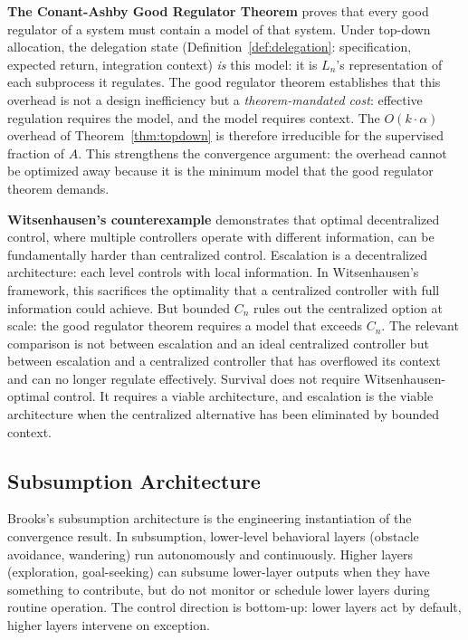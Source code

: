 \documentclass[11pt]{article}
\theoremstyle{definition}
\begin{document}
\textbf{The Conant-Ashby Good Regulator Theorem} \cite{ConantAshby1970}
proves that every good regulator of a system must contain a model of
that system. Under top-down allocation, the delegation state
(Definition~\ref{def:delegation}: specification, expected return,
integration context) \emph{is} this model: it is $L_n$'s
representation of each subprocess it regulates. The good regulator
theorem establishes that this overhead is not a design inefficiency but
a \emph{theorem-mandated cost}: effective regulation requires the model,
and the model requires context. The $O(k \cdot \alpha)$ overhead of
Theorem~\ref{thm:topdown} is therefore irreducible for the supervised
fraction of $A$. This strengthens the convergence argument: the
overhead cannot be optimized away because it is the minimum model
that the good regulator theorem demands.

\textbf{Witsenhausen's counterexample} \cite{Witsenhausen1968}
demonstrates that optimal decentralized control, where multiple
controllers operate with different information, can be fundamentally
harder than centralized control. Escalation is a decentralized
architecture: each level controls with local information. In
Witsenhausen's framework, this sacrifices the optimality that a
centralized controller with full information could achieve. But
bounded $C_n$ rules out the centralized option at scale: the good
regulator theorem requires a model that exceeds $C_n$. The relevant
comparison is not between escalation and an ideal centralized
controller but between escalation and a centralized controller that
has overflowed its context and can no longer regulate effectively.
Survival does not require Witsenhausen-optimal control. It requires
a viable architecture, and escalation is the viable architecture when
the centralized alternative has been eliminated by bounded context.

\subsection{Subsumption Architecture}

Brooks's subsumption architecture \cite{Brooks1986} is the engineering
instantiation of the convergence result. In subsumption, lower-level
behavioral layers (obstacle avoidance, wandering) run autonomously and
continuously. Higher layers (exploration, goal-seeking) can subsume
lower-layer outputs when they have something to contribute, but do not
monitor or schedule lower layers during routine operation. The control
direction is bottom-up: lower layers act by default, higher layers
intervene on exception.
\end{document}
